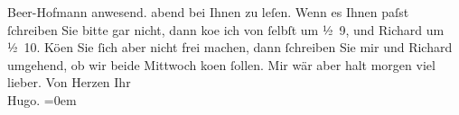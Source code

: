 \begin{ledgroupsized}[t]{13cm}
{{{                     Beer-Hofmann anwesend.}}}\label{K_L00881_1h}{ }abend bei Ihnen zu leſen. Wenn es Ihnen paſst ſchreiben Sie bitte gar
               nicht, dann ko{\geminationm}e ich von ſelbſt um ½ 9, und
                  Richard um ½ 10. Kö{\geminationn}en Sie ſich aber nicht frei machen, dann ſchreiben Sie
               mir und Richard umgehend, ob wir beide
                  Mittwoch ko{\geminationm}en ſollen. Mir wär aber halt
               morgen viel lieber.\pend
           \pstart
           Von Herzen Ihr{\\[\baselineskip]}\spacefill\mbox{Hugo.}\pend
           \leftskip=0em{}
         
         \endnumbering{}\end{ledgroupsized}  \newcommand{\dateiname}{L00881}\newcommand{\titel}{Hugo von Hofmannsthal an Arthur Schnitzler, [16. 1. 1899]}\newcommand{\editorInnen}{Martin Anton Müller und Gerd-Hermann Susen}
      